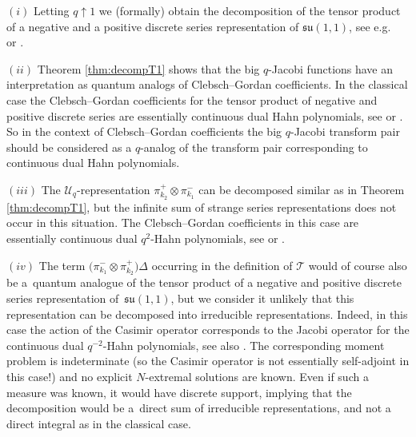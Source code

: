 \documentclass[pdftex]{sigma}
\numberwithin{equation}{section}
\numberwithin{theorem}{section}
\numberwithin{proposition}{section}
\numberwithin{lemma}{section}
\numberwithin{corollary}{section}
\numberwithin{definition}{section}
\numberwithin{example}{section}
\numberwithin{remark}{section}
\numberwithin{note}{section}
\newcommand{\su}{\mathfrak{su}}
\newcommand{\U}{\mathcal U}
\begin{document}
\begin{remark}
$(i)$ Letting $q \uparrow 1$ we (formally) obtain the decomposition of the tensor product of a negative and a positive discrete series representation of $\su(1,1)$, see e.g.~\cite[Theorem 7.3]{Re} or \cite[Theorem 2.2]{GK02}.

$(ii)$ Theorem \ref{thm:decompT1} shows that the big $q$-Jacobi functions have an interpretation as quantum analogs of Clebsch--Gordan coef\/f\/icients. In the classical case the Clebsch--Gordan coef\/f\/icients for the tensor product of negative and positive discrete series are essentially continuous dual Hahn polynomials, see \cite[Section~4]{OZ} or \cite[Theorem~2.2]{GK02}. So in the context of Clebsch--Gordan coef\/f\/icients the big $q$-Jacobi transform pair should be considered as a $q$-analog of the transform pair corresponding to continuous dual Hahn polynomials.

$(iii)$ The $\U_q$-representation $\pi_{k_2}^+\otimes \pi_{k_1}^-$ can be decomposed similar as in Theorem \ref{thm:decompT1}, but the inf\/inite sum of strange series representations does not occur in this situation. The Clebsch--Gordan coef\/f\/icients in this case are essentially continuous dual $q^2$-Hahn polynomials, see \cite[Section 2]{KM} or \cite[Theorem 2.4]{Gr04}.

$(iv)$ The term $\big( \pi_{k_1}^- \otimes \pi_{k_2}^+\big)\Delta$ occurring in the def\/inition of $\mathcal T$ would of course also be a~quantum analogue of the tensor product of a negative and positive discrete series representation of~$\su(1,1)$, but we consider it unlikely that this representation can be decomposed into irreducible representations. Indeed, in this case the action of the Casimir operator corresponds to the Jacobi operator for the continuous dual $q^{-2}$-Hahn polynomials, see also \cite[Remark~8.1]{Gr06}. The corresponding moment problem is indeterminate (so the Casimir operator is not essentially self-adjoint in this case!) and no explicit $N$-extremal solutions are known. Even if such a measure was known, it would have discrete support, implying that the decomposition would be a~direct sum of irreducible representations, and not a direct integral as in the classical case.
\end{remark}
\end{document}
